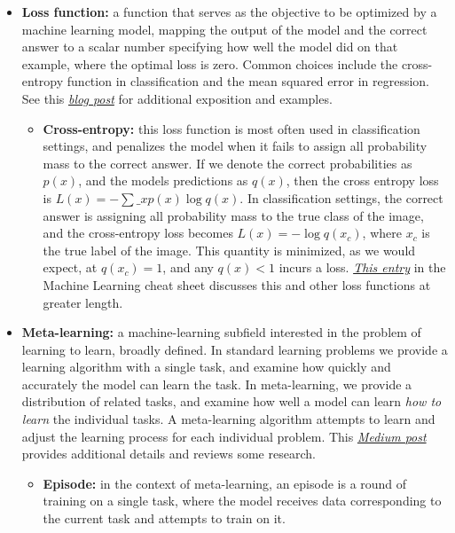 \begin{itemize}
\begin{itemize}
  \end{itemize}
\item \textbf{Loss function:\label{tg:loss}} a function that serves as the objective to be optimized by a machine learning model, mapping the output of the model and the correct answer to a scalar number specifying how well the model did on that example, where the optimal loss is zero. Common choices include the cross-entropy function in classification and the mean squared error in regression. See this \href{https://blog.algorithmia.com/introduction-to-loss-functions/}{\emph{blog post}} for additional exposition and examples.

  \begin{itemize}
  \item \textbf{Cross-entropy:\label{tg:cross-entropy}} this loss function is most often used in classification settings, and penalizes the model when it fails to assign all probability mass to the correct answer. If we denote the correct probabilities as $p(x)$, and the models predictions as $q(x)$, then the cross entropy loss is $L(x) = - \sum\_x p(x) \log q(x)$. In classification settings, the correct answer is assigning all probability mass to the true class of the image, and the cross-entropy loss becomes $L(x) = - \log q(x_c)$, where $x_c$ is the true label of the image. This quantity is minimized, as we would expect, at $q(x_c) = 1$, and any $q(x) < 1$ incurs a loss. \href{https://ml-cheatsheet.readthedocs.io/en/latest/loss_functions.html}{\emph{This entry}} in the Machine Learning cheat sheet discusses this and other loss functions at greater length.
  \end{itemize}
  
\item \textbf{Meta-learning:\label{tg:meta-learning}} a machine-learning subfield interested in the problem of learning to learn, broadly defined. In standard learning problems we provide a learning algorithm with a single task, and examine how quickly and accurately the model can learn the task. In meta-learning, we provide a distribution of related tasks, and examine how well a model can learn \emph{how to learn} the individual tasks. A meta-learning algorithm attempts to learn and adjust the learning process for each individual problem. This \href{https://medium.com/huggingface/from-zero-to-research-an-introduction-to-meta-learning-8e16e677f78a}{\emph{Medium post}} provides additional details and reviews some research.

  \begin{itemize} 
  \item \textbf{Episode:\label{tg:episode}} in the context of meta-learning, an episode is a round of training on a single task, where the model receives data corresponding to the current task and attempts to train on it.
  

\end{itemize}
\end{itemize}

